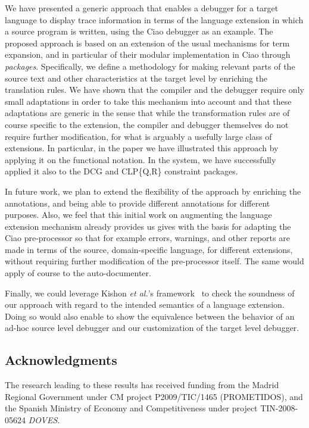 \documentclass[preprint]{llncs}
\begin{document}
We have presented a generic approach that enables a debugger for a
target language to display trace information in terms of the language
extension in which a source program is written, using the Ciao
debugger as an example. The proposed approach is based on an extension
of the usual mechanisms for term expansion, and in particular of their
modular implementation in Ciao through \emph{packages}. Specifically,
we define a methodology for making relevant parts of the source text
and other characteristics at the target level by enriching the
translation rules.  We have shown that the compiler and the debugger
require only small adaptations in order to take this mechanism into
account and that these adaptations are generic in the sense that while
the transformation rules are of course specific to the extension, the
compiler and debugger themselves do not require further modification,
for what is arguably a usefully large class of extensions. In
particular, in the paper we have illustrated this approach by applying
it on the functional notation. In the system,
we have successfully applied it also to the DCG and CLP\{Q,R\}
constraint packages.

In future work, we plan to extend the flexibility of the approach by
enriching the annotations, and being able to provide different
annotations for different purposes. 
Also, we feel that this initial work on augmenting the language
extension mechanism already provides us gives with the basis for
adapting the Ciao pre-processor so that for example errors, warnings,
and other reports are made in terms of the source, domain-specific
language, for different extensions, without requiring further
modification of the pre-processor itself.  The same would apply of
course to the auto-documenter. 

Finally, we could leverage Kishon \emph{et al.}'s
framework~\cite{kishonmonitoring} to check the soundness
of our approach with regard to the intended semantics of a language extension.
Doing so would also enable to show the equivalence
between the behavior of an ad-hoc source level debugger and our customization
of the target level debugger.




\subsection*{Acknowledgments}

The research leading to these results has received funding from the
Madrid Regional Government under CM project P2009/TIC/1465
(PROMETIDOS), and the Spanish Ministry of Economy and Competitiveness
under project TIN-2008-05624 {\em DOVES}.







\end{document}
